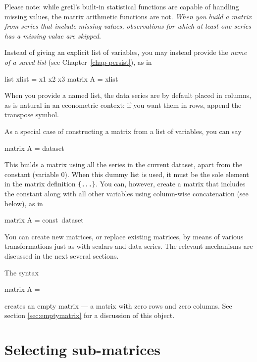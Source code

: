 Please note: while gretl's built-in statistical functions are
capable of handling missing values, the matrix arithmetic functions
are not.  \emph{When you build a matrix from series that include missing
values, observations for which at least one series has a missing value
are skipped}.  

Instead of giving an explicit list of variables, you may instead
provide the \textit{name of a saved list} (see
Chapter~\ref{chap-persist}), as in
%
\begin{code}
list xlist = x1 x2 x3
matrix A = { xlist }
\end{code}
%
When you provide a named list, the data series are by default placed
in columns, as is natural in an econometric context: if you want them
in rows, append the transpose symbol.

As a special case of constructing a matrix from a list of variables,
you can say
%
\begin{code}
matrix A = { dataset }
\end{code}
%
This builds a matrix using all the series in the current dataset,
apart from the constant (variable 0).  When this dummy list is used, it
must be the sole element in the matrix definition \texttt{\{...\}}.  You
can, however, create a matrix that includes the constant along with
all other variables using column-wise concatenation (see below), as in
%
\begin{code}
matrix A = {const}~{dataset}
\end{code}
%

You can create new matrices, or replace existing matrices, by means of
various transformations just as with scalars and data series.  The
relevant mechanisms are discussed in the next several sections.

The syntax 
%
\begin{code}
matrix A = {}
\end{code}
%
creates an empty matrix --- a matrix with zero rows and zero columns.
See section \ref{sec:emptymatrix} for a discussion of this
object.


\section{Selecting sub-matrices}
\label{matrix-sub}


